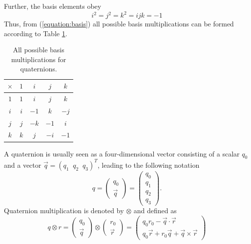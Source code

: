 \documentclass{LTHthesis}
\begin{document}
Further, the basis elements obey
%
\begin{equation}
\label{equation:basis}
i^2=j^2=k^2=ijk=-1
\end{equation}
%
Thus, from (\ref{equation:basis}) all possible basis multiplications can be formed according to Table \ref{table:basis}.
%
\begin{table}[!hbt]
\begin{center}
\begin{tabular}{|c|c|c|c|c|}
\hline
$\times$ & $1$ & $i$ & $j$ & $k$ \\
\hline
$1$ & $1$ & $i$ & $j$ & $k$ \\
\hline 
$i$ & $i$ & $-1$ & $k$ & $-j$\\
\hline
$j$ & $j$ & $-k$ & $-1$ & $i$ \\
\hline
$k$ & $k$ & $j$ & $-i$ & $-1$ \\
\hline
\end{tabular}
\end{center}
\caption{All possible basis multiplications for quaternions.}
\label{table:basis}
\end{table}
%
A quaternion is usually seen as a four-dimensional vector consisting of a scalar $q_0$ and a vector $\vec{q} = (q_1 \; \; q_2 \; \; q_3)^T$, leading to the following notation
%
\begin{equation}
q = \left(\begin{array}{c}q_0\\ \vec{q}\end{array}\right) = \left(\begin{array}{c}q_0\\ q_1 \\ q_2 \\ q_3\end{array}\right). 
\end{equation}  
%
Quaternion multiplication is denoted by $\otimes$ and defined as
%
\begin{equation}
q\otimes r = \left(\begin{array}{c}q_0\\ \vec{q}\end{array}\right) \otimes \left(\begin{array}{c}r_0\\ \vec{r}\end{array}\right) =
\left(\begin{array}{c}q_0r_0-\vec{q} \cdot \vec{r}\\ q_0\vec{r}+r_0\vec{q}+\vec{q}\times \vec{r}\end{array}\right)
\end{equation}
\end{document}

